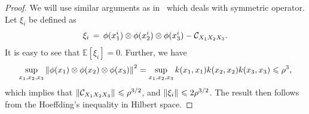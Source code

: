 \begin{proof}
We will use similar arguments as in~\cite{RosBelVit2010} which deals with symmetric operator. Let $\xi_{i}$ be defined as
\begin{eqnarray}
\xi_{i}\, =\, \phi(x_1^i) \otimes \phi(x_2^i) \otimes \phi(x_3^i)  - \mathcal{C}_{X_1 X_2 X_3}.
\end{eqnarray}
It is easy to see that $\mathbb{E}[\xi_{i}] = 0$. Further, we have
\begin{eqnarray}
	\sup_{x_1,x_2,x_3} \left\|\phi(x_1) \otimes \phi(x_2) \otimes \phi(x_3)\right\|^{2}_{}
    = \sup_{x_1,x_2,x_3} k(x_1, x_1) k(x_2,x_2) k(x_3,x_3)
    \leqslant \rho^{3},
\end{eqnarray}
which implies that $\left\|\mathcal{C}_{X_1 X_2 X_3}\right\|_{} \leqslant \rho^{3/2}$, and $\left\|\xi_i\right\|_{} \leqslant 2 \rho^{3/2}$. The result then follows from the Hoeffding's inequality in Hilbert space.
\end{proof}
